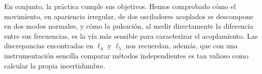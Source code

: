 \documentclass[a4paper,11pt]{amsart}
\numberwithin{equation}{section}
\theoremstyle{cienplano}
\theoremstyle{ciendef}
\theoremstyle{cienobs}
\begin{document}
En conjunto, la práctica cumple sus objetivos. Hemos comprobado cómo el
movimiento, en apariencia irregular, de dos osciladores acoplados se
descompone en dos modos normales, y cómo la pulsación, al medir directamente
la diferencia entre sus frecuencias, es la vía más sensible para
caracterizar el acoplamiento. Las discrepancias encontradas en $\ell_4$ y
$\ell_5$ nos recuerdan, además, que con una instrumentación sencilla comparar
métodos independientes es tan valioso como calcular la propia incertidumbre.

\newpage
\nocite{TIPLER,HUGHES,FIV-T4}
\printbibliography[title={Referencias}]
\end{document}
